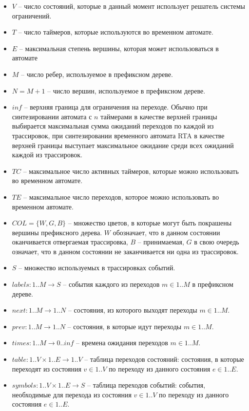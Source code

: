 \documentclass[times,specification,annotation]{itmo-student-thesis}
\begin{document}
\begin{itemize}
  \item $V$ -- число состояний, которые в данный момент использует решатель системы ограничений.
  \item $T$ -- число таймеров, которые используются во временном автомате.
  \item $E$ -- максимальная степень вершины, которая может использоваться в автомате
  \item $M$ -- число ребер, используемое в префиксном дереве.
  \item $N = M + 1$ -- число вершин, используемое в префиксном дереве.
  \item $inf$ -- верхняя граница для ограничения на переходе. Обычно при синтезировании автомата с $n$ таймерами в качестве верхней границы выбирается максимальная сумма
    ожиданий переходов по каждой из трассировок, при синтезировании временного автомата RTA в качестве верхней границы выступает максимальное ожидание среди всех ожиданий
    каждой из трассировок.
  \item $TC$ -- максимальное число активных таймеров, которые можно использовать во временном автомате.
  \item $TE$ -- максимальное число переходов, которое можно использовать во временном автомате.
  \item $COL = \{ W, G, B \}$ -- множество цветов, в которые могут быть покрашены вершины префиксного дерева. $W$ обозначает, что в данном состоянии оканчивается отвергаемая
    трассировка, $B$ -- принимаемая, $G$ в свою очередь означает, что в данном состоянии не заканчивается ни одна из трассировок.
  \item $S$ -- множество используемых в трассировках событий.
  \item $labels: 1..M \rightarrow S$ -- события каждого из переходов $m \in 1..M$ в префиксном дереве.
  \item $next: 1..M \rightarrow 1..N$ -- состояния, из которого выходят переходы $m \in 1..M$.
  \item $prev: 1..M \rightarrow 1..N$ -- состояния, в которые идут переходы $m \in 1..M$.
  \item $times: 1..M \rightarrow 0..inf$ -- времена ожидания переходов $m \in 1..M$.
  \item $table: 1..V \times 1..E \rightarrow 1..V$ -- таблица переходов состояний: состояния, в которые переходят из состояния $v \in 1..V$ по переходу из данного состояния $e \in 1..E$.
  \item $symbols: 1..V \times 1..E \rightarrow S$ -- таблица переходов событий: события, необходимые для перехода из состояния $v \in 1..V$ по переходу из данного состояния $e \in 1..E$.

\end{itemize}
\end{document}
